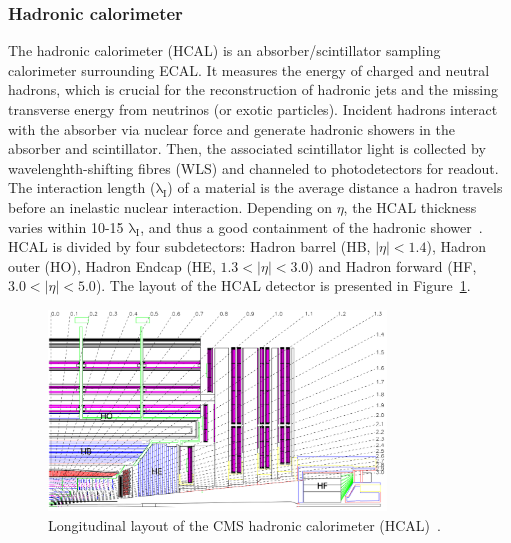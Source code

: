 \subsubsection{Hadronic calorimeter}
The hadronic calorimeter (HCAL) is an absorber/scintillator sampling calorimeter surrounding ECAL. It measures the energy of charged and neutral hadrons, which is crucial for the reconstruction of hadronic jets and the missing transverse energy from neutrinos (or exotic particles). Incident hadrons interact with the absorber via nuclear force and generate hadronic showers in the absorber and scintillator. Then, the associated scintillator light is collected by wavelenghth-shifting fibres (WLS) and channeled to photodetectors for readout. The interaction length ($\mathrm{\lambda_{I}}$) of a material is the average distance a hadron travels before an inelastic nuclear interaction. Depending on $\eta$, the HCAL thickness varies within 10-15 $\mathrm{\lambda_{I}}$, and thus a good containment of the hadronic shower~\cite{CMS:2008xjf,CMS:2006myw}. HCAL is divided by four subdetectors: Hadron barrel (HB, $|\eta|<1.4$), Hadron outer (HO), Hadron Endcap (HE, $1.3<|\eta|<3.0$) and Hadron forward (HF, $3.0<|\eta|<5.0$). The layout of the HCAL detector is presented in Figure~\ref{fig:cmshcal}.

\begin{figure}[ht!]
\centering
\includegraphics[width=0.8\textwidth]{Figures/Apparatus/cmshcal.png}
\caption[Longitudinal layout of the CMS hadronic calorimeter (HCAL)]{Longitudinal layout of the CMS hadronic calorimeter (HCAL)~\cite{CMS:2008xjf}.}
\label{fig:cmshcal}
\end{figure}

